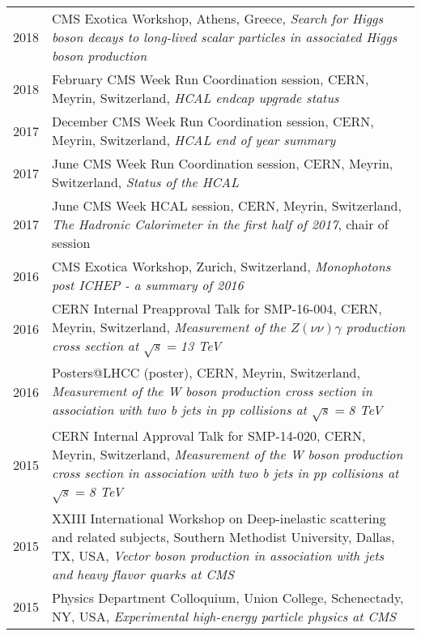 \documentclass[10pt]{article} %
\begin{document}
\begin{tabulary}{0.9\textwidth}{RL}	

2018 & CMS Exotica Workshop, Athens, Greece,
 \emph{Search for Higgs boson decays to long-lived scalar particles in associated Higgs boson production} \\

2018 & February CMS Week Run Coordination session, CERN, Meyrin, Switzerland,
 \emph{HCAL endcap upgrade status} \\

2017 & December CMS Week Run Coordination session, CERN, Meyrin, Switzerland,
 \emph{HCAL end of year summary} \\

2017 & June CMS Week Run Coordination session, CERN, Meyrin, Switzerland,
 \emph{Status of the HCAL} \\

2017 & June CMS Week HCAL session, CERN, Meyrin, Switzerland,
 \emph{The Hadronic Calorimeter in the first half of 2017}, chair of session \\

2016 & CMS Exotica Workshop, Zurich, Switzerland, 
 \emph{Monophotons post ICHEP - a summary of 2016} \\ 

2016 & CERN Internal Preapproval Talk for SMP-16-004, CERN, Meyrin, Switzerland, 
 \emph{Measurement of the $Z(\nu\nu)\gamma$ production cross section at $\sqrt{s}=$13 TeV} \\

2016 & Posters@LHCC (poster), CERN, Meyrin, Switzerland, 
 \emph{Measurement of the W boson production cross section in association with two
 b jets in pp collisions at $\sqrt{s}=$8 TeV} \\

2015 & CERN Internal Approval Talk for SMP-14-020, CERN, Meyrin, Switzerland, 
 \emph{Measurement of the W boson production cross section in association with two
 b jets in pp collisions at $\sqrt{s}=$8 TeV} \\

2015 & XXIII International Workshop on Deep-inelastic scattering and related subjects, Southern Methodist University, Dallas, TX, USA, 
 \emph{Vector boson production in association with jets and heavy flavor quarks at CMS} \\

2015 & Physics Department Colloquium, Union College, Schenectady, NY, USA, 
 \emph{Experimental high-energy particle physics at CMS} \\


\end{tabulary}
\end{document}
